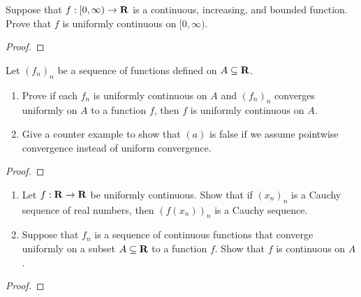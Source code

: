 \documentclass[11pt,twoside,openany]{memoir}
\begin{document}
\newpage
\fancyhead[L]{\scalebox{0.9}{Continuity}}
\fancyhead[R]{\scalebox{0.9}{Appeared on: W25}}
\begin{problem}
    Suppose that $f:[0,\infty) \rightarrow \mathbf{R}$ is a continuous, increasing, and bounded function. Prove that $f$ is uniformly continuous on $[0,\infty)$.
\end{problem}
\begin{proof}
\end{proof}

\newpage
\fancyhead[L]{\scalebox{0.9}{Continuity}}
\fancyhead[R]{\scalebox{0.9}{Appeared on: --}}
\begin{problem}
    Let $(f_n)_n$ be a sequence of functions defined on $A \subseteq \mathbf{R}$.
    \begin{enumerate}[label = (\arabic*)]
        \item Prove if each $f_n$ is uniformly continuous on $A$ and $(f_n)_n$ converges uniformly on $A$ to a function $f$, then $f$ is uniformly continuous on $A$.
        \item Give a counter example to show that $(a)$ is false if we assume pointwise convergence instead of uniform convergence.
    \end{enumerate}
\end{problem}
\begin{proof}
\end{proof}

\newpage
\fancyhead[L]{\scalebox{0.9}{Continuity}}
\fancyhead[R]{\scalebox{0.9}{Appeared on: S14}}
\begin{problem}
    \phantom{a}
    \begin{enumerate}[label = (\arabic*)]
        \item Let $f:\mathbf{R} \rightarrow \mathbf{R}$ be uniformly continuous. Show that if $(x_n)_n$ is a Cauchy sequence of real numbers, then $(f(x_n))_n$ is a Cauchy sequence.
        \item Suppose that $f_n$ is a sequence of continuous functions that converge uniformly on a subset $A \subseteq \mathbf{R}$ to a function $f$. Show that $f$ is continuous on $A$. 
    \end{enumerate}
\end{problem}
\begin{proof}
\end{proof}
\end{document}

